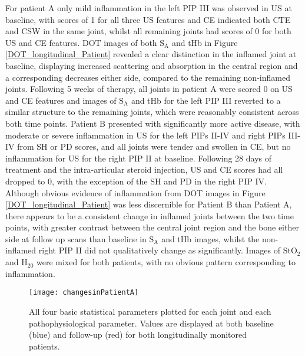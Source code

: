 \documentclass[twoside]{bhamthesis}
\theoremstyle{definition}
\begin{document}
For patient A only mild inflammation in the left PIP III was observed in US at baseline, with scores of 1 for all three US features and CE indicated both CTE and CSW in the same joint, whilst all remaining joints had scores of 0 for both US and CE features. DOT images of both $\mathrm{S_A}$ and tHb in Figure \ref{DOT_longitudinal_Patient} revealed a clear distinction in the inflamed joint at baseline, displaying increased scattering and absorption in the central region and a corresponding decreases either side, compared to the remaining non-inflamed joints. Following 5 weeks of therapy, all joints in patient A were scored 0 on US and CE features and images of $\mathrm{S_A}$ and tHb for the left PIP III reverted to a similar structure to the remaining joints, which were reasonably consistent across both time points. Patient B presented with significantly more active disease, with moderate or severe inflammation in US for the left PIPs II-IV and right PIPs III-IV from SH or PD scores, and all joints were tender and swollen in CE, but no inflammation for US for the right PIP II at baseline. Following 28 days of treatment and the intra-articular steroid injection, US and CE scores had all dropped to 0, with the exception of the SH and PD in the right PIP IV. Although obvious evidence of inflammation from DOT images in Figure \ref{DOT_longitudinal_Patient} was less discernible for Patient B  than Patient A, there appears to be a consistent change in inflamed joints between the two time points, with greater contrast between the central joint region and the bone either side at follow up scans than baseline in $\mathrm{S_A}$ and tHb images, whilst the non-inflamed right PIP II did not qualitatively change as significantly. Images of $\mathrm{StO_2}$ and $\mathrm{H_20}$ were mixed for both patients, with no obvious pattern corresponding to inflammation.  

\begin{figure}[!ht]
\centering\texttt{[image: changesinPatientA]}\caption{All four basic statistical parameters plotted for each joint and each pathophysiological parameter. Values are displayed at both baseline (blue) and follow-up (red) for both longitudinally monitored patients.}
\label{changesinPatientA} 
\end{figure}
\end{document}
